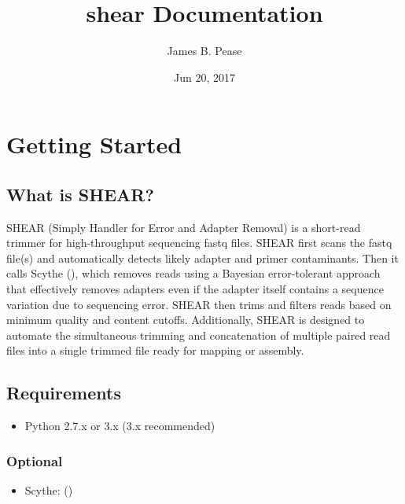 \documentclass[letterpaper,10pt,english]{sphinxmanual}
\title{shear Documentation}
\date{Jun 20, 2017}
\author{James B. Pease}
\begin{document}
\maketitle
\sphinxtableofcontents
{}\label{\detokenize{index::doc}}



\chapter{Getting Started}
\label{\detokenize{intro:welcome-to-shear-s-documentation}}\label{\detokenize{intro:getting-started}}\label{\detokenize{intro:intro}}\label{\detokenize{intro::doc}}

\section{What is SHEAR?}
\label{\detokenize{intro:what-is-shear}}
SHEAR (Simply Handler for Error and Adapter Removal) is a short-read trimmer for high-throughput sequencing fastq files.
SHEAR first scans the fastq file(s) and automatically detects likely adapter and primer contaminants.  Then it calls
Scythe (), which removes reads using a Bayesian error-tolerant approach that
effectively removes adapters even if the adapter itself contains a sequence variation due to sequencing error.
SHEAR then trims and filters reads based on minimum quality and content cutoffs.  Additionally, SHEAR is designed to
automate the simultaneous trimming and concatenation of multiple paired read files into a single trimmed file ready
for mapping or assembly.


\section{Requirements}
\label{\detokenize{intro:requirements}}\begin{itemize}
\item {} 
Python 2.7.x or 3.x (3.x recommended)

\end{itemize}


\subsection{Optional}
\label{\detokenize{intro:optional}}\begin{itemize}
\item {} 
Scythe:  ()

\end{itemize}
\end{document}
